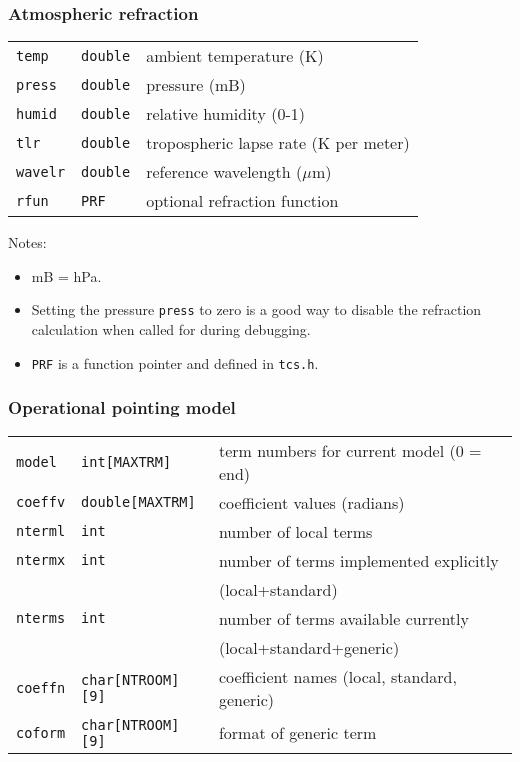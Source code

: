 \documentclass[12pt,fleqn,twoside]{article}
\renewcommand{\_}{{\tt\char'137}}     %
\newcommand{\notelist}  {\goodbreak \vspace{1ex} Notes:
                        \vspace{-3ex}}
\begin{document}
\subsubsection{Atmospheric refraction}
\begin{tabular}{lll}
{\tt temp}  & {\tt double} & ambient temperature (K) \\
{\tt press} & {\tt double} & pressure (mB) \\
{\tt humid} & {\tt double} & relative humidity (0-1) \\
{\tt tlr}   & {\tt double} & tropospheric lapse rate (K per meter) \\
{\tt wavelr}& {\tt double} & reference wavelength ($\mu$m) \\
{\tt rfun}  & {\tt PRF}    & optional refraction function \\
\end{tabular}

\notelist
\begin{itemize}
\item mB = hPa.
\item Setting the pressure {\tt press} to zero is a good way to disable the
      refraction calculation when called for during debugging.
\item {\tt PRF} is a function pointer and defined in {\tt tcs.h}.
\end{itemize}

\subsubsection{Operational pointing model}
\begin{tabular}{lll}
{\tt model} & {\tt int[MAXTRM]} & term numbers for current model (0 = end) \\
{\tt coeffv} & {\tt double[MAXTRM]} & coefficient values (radians) \\
{\tt nterml} & {\tt int} & number of local terms \\
{\tt ntermx} & {\tt int} & number of terms implemented explicitly \\
{} & {} & \hfill (local+standard) \\
{\tt nterms} & {\tt int} & number of terms available currently \\
{} & {} & \hfill (local+standard+generic) \\
{\tt coeffn} & {\tt char[NTROOM][9]} & coefficient names (local,
                                standard, generic) \\
{\tt coform} & {\tt char[NTROOM][9]} & format of generic term \\
\end{tabular}
\end{document}
